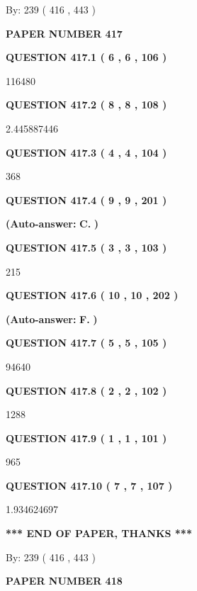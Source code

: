 \documentclass{ctexart}
\begin{document}
   
\hspace{1.0in} By: 
 239 ( 416 ,  443 )
   
   
   
   
\newpage 
\setcounter{page}{ 
   417001 } 
   
   
 {\textbf{ \Large{ PAPER NUMBER  417  }}}
   
   
   
   
  
  
{\textbf{\large{QUESTION
417.1 
 ( 6 , 6 , 106 )
}}}

116480
  
  
{\textbf{\large{QUESTION
417.2 
 ( 8 , 8 , 108 )
}}}

2.445887446
  
  
{\textbf{\large{QUESTION
417.3 
 ( 4 , 4 , 104 )
}}}

368
  
  
{\textbf{\large{QUESTION
417.4 
 ( 9 , 9 , 201 )
}}}
 
 
{\textbf{(Auto-answer:}}
{\textbf{\large{
C.}}}
{\textbf{)}}
 
 
  
  
{\textbf{\large{QUESTION
417.5 
 ( 3 , 3 , 103 )
}}}

215
  
  
{\textbf{\large{QUESTION
417.6 
 ( 10 , 10 , 202 )
}}}
 
 
{\textbf{(Auto-answer:}}
{\textbf{\large{
F.}}}
{\textbf{)}}
 
 
  
  
{\textbf{\large{QUESTION
417.7 
 ( 5 , 5 , 105 )
}}}

94640
  
  
{\textbf{\large{QUESTION
417.8 
 ( 2 , 2 , 102 )
}}}

1288
  
  
{\textbf{\large{QUESTION
417.9 
 ( 1 , 1 , 101 )
}}}

965
  
  
{\textbf{\large{QUESTION
417.10 
 ( 7 , 7 , 107 )
}}}

1.934624697
   
   
   
   
\vspace{1.0in} 
{\textbf{\large{ *** END OF PAPER, THANKS *** }}} 
   
   
\hspace{1.0in} By: 
 239 ( 416 ,  443 )
   
   
   
   
\newpage 
\setcounter{page}{ 
   418001 } 
   
   
 {\textbf{ \Large{ PAPER NUMBER  418  }}}
   
\end{document}
